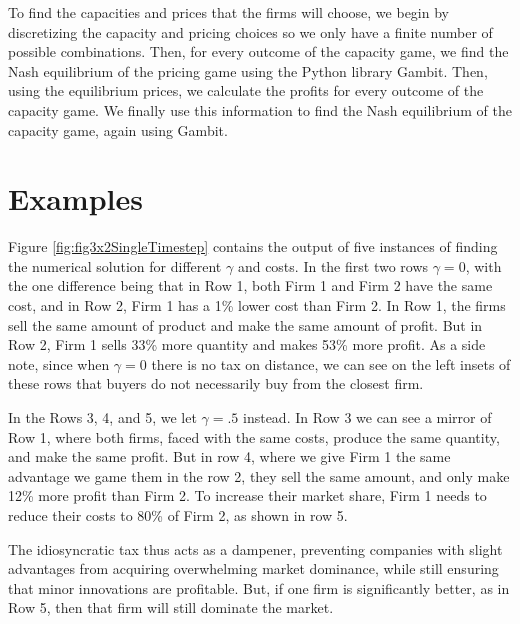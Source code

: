 \documentclass[11pt]{article}
\begin{document}
To find the capacities and prices that the firms will choose, we begin by
discretizing the capacity and pricing choices so we only have a finite number
of possible combinations. Then, for every outcome of the capacity game, we find
the Nash equilibrium of the pricing game using the Python library Gambit. Then,
using the equilibrium prices, we calculate the profits for every outcome of the
capacity game. We finally use this information to find the Nash equilibrium of
the capacity game, again using Gambit.

\section{Examples}
Figure \ref{fig:fig3x2SingleTimestep} contains the output of five instances
of finding the numerical solution for different $\gamma$ and costs. In the
first two rows $\gamma=0$, with the one difference being that in Row 1, both
Firm 1 and Firm 2 have the same cost, and in Row 2, Firm 1 has a 1\% lower cost
than Firm 2. In Row 1, the firms sell the same amount of product and make the
same amount of profit. But in Row 2, Firm 1 sells 33\% more quantity and makes
53\% more profit. As a side note, since when $\gamma = 0$ there is no tax on
distance, we can see on the left insets of these rows that buyers do not
necessarily buy from the closest firm.

In the Rows 3, 4, and 5, we let $\gamma = .5$ instead. In Row 3 we can see a
mirror of Row 1, where both firms, faced with the same costs, produce the same
quantity, and make the same profit. But in row 4, where we give Firm 1 the same
advantage we game them in the row 2, they sell the same amount, and only make
12\% more profit than Firm 2. To increase their market share, Firm 1 needs to
reduce their costs to 80\% of Firm 2, as shown in row 5.

The idiosyncratic tax thus acts as a dampener, preventing companies with
slight advantages from acquiring overwhelming market dominance, while still
ensuring that minor innovations are profitable. But, if one firm is
significantly better, as in Row 5, then that firm will still dominate the
market.
\end{document}
